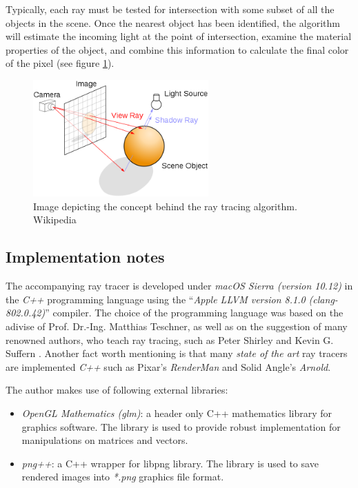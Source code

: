 \documentclass{article}
\begin{document}
Typically, each ray must be tested for intersection with some subset of all the objects in the scene. Once the nearest object has been identified, the algorithm will estimate the incoming light at the point of intersection, examine the material properties of the object, and combine this information to calculate the final color of the pixel (see figure \ref{fig:concept}). 

\begin{figure}[h]
	\centering
    \includegraphics[width=0.6\textwidth]{ray_trace_algo}
	\caption{Image depicting the concept behind the ray tracing algorithm. Wikipedia}
    \label{fig:concept}
\end{figure}

\subsection{Implementation notes}

The accompanying ray tracer is developed under \textit{macOS Sierra (version 10.12)} in the \textit{C++} programming language using the ``\textit{Apple LLVM version 8.1.0 (clang-802.0.42)}'' compiler. The choice of the programming language was based on the adivise of Prof. Dr.-Ing. Matthias Teschner, as well as on the suggestion of many renowned authors, who teach ray tracing, such as Peter Shirley \cite{realisticRaytracing} and Kevin G. Suffern \cite{rftgu}. Another fact worth mentioning is that many \textit{state of the art} ray tracers are implemented \textit{C++} such as Pixar's \textit{RenderMan}  and Solid Angle's \textit{Arnold}.

\vspace*{\baselineskip}

The author makes use of following external libraries:
\begin{itemize}
	\itemsep0em 	%
	\item \textit{OpenGL Mathematics (glm)}: a header only C++ mathematics library for graphics software. The library is used to provide robust implementation for manipulations on matrices and vectors.
	\item \textit{png++}: a C++ wrapper for libpng library. The library is used to save rendered images into \textit{*.png} graphics file format. 
\end{itemize}
\end{document}
